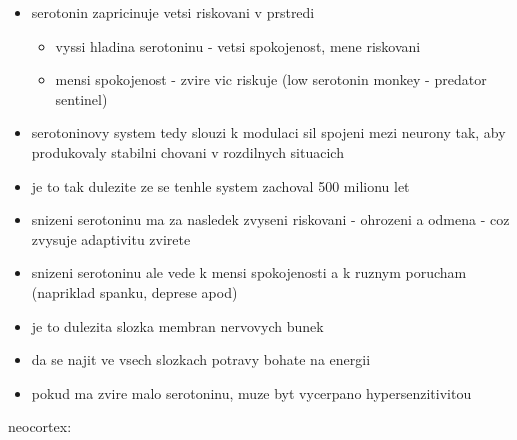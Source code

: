 \documentclass[journal,onecolumn]{IEEEtrancz}
\begin{document}
\begin{itemize}
\begin{itemize}
		\item serotonin zapricinuje vetsi riskovani v prstredi
		\begin{itemize}
			\item vyssi hladina serotoninu - vetsi spokojenost, mene riskovani	
			\item mensi spokojenost - zvire vic riskuje (low serotonin monkey - predator sentinel)
				\vspace{3mm}
		\end{itemize}

		\item serotoninovy system tedy slouzi k modulaci sil spojeni mezi neurony tak, aby produkovaly stabilni chovani v rozdilnych situacich
		\item je to tak dulezite ze se tenhle system zachoval 500 milionu let
		\item snizeni serotoninu ma za nasledek zvyseni riskovani - ohrozeni a odmena - coz zvysuje adaptivitu zvirete
		\item snizeni serotoninu ale vede k mensi spokojenosti a k ruznym porucham (napriklad spanku, deprese apod)
		\item je to dulezita slozka membran nervovych bunek
		\item da se najit ve vsech slozkach potravy bohate na energii
		\item pokud ma zvire malo serotoninu, muze byt vycerpano hypersenzitivitou
			\vspace{3mm}
			\vspace{3mm}
	\end{itemize}
\end{itemize}
neocortex:
\end{document}
